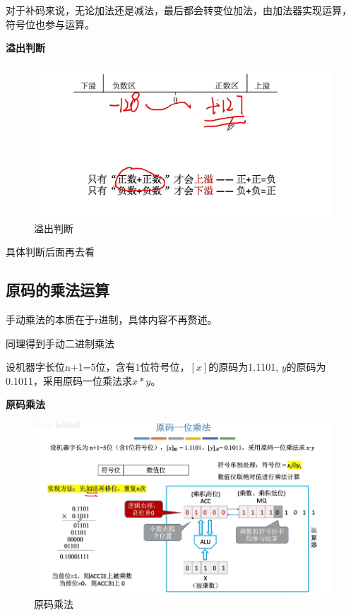 \documentclass[12pt]{ctexart}
\begin{document}
对于补码来说，无论加法还是减法，最后都会转变位加法，由加法器实现运算，
符号位也参与运算。

\textbf{溢出判断}
\begin{figure}[htbp]
    \centering
    \includegraphics[scale=0.6]{溢出判断.png}
    \caption{溢出判断}
    \end{figure} 

具体判断后面再去看

\subsection{原码的乘法运算}

手动乘法的本质在于r进制，具体内容不再赘述。

同理得到手动二进制乘法

设机器字长位n+1=5位，含有1位符号位，$[x]$的原码为1.1101,
$y$的原码为0.1011，采用原码一位乘法求$x*y$。

\textbf{原码乘法}
\begin{figure}[htbp]
    \centering
    \includegraphics[scale=0.6]{原码乘法.png}
    \caption{原码乘法}
    \end{figure} 
\end{document}
